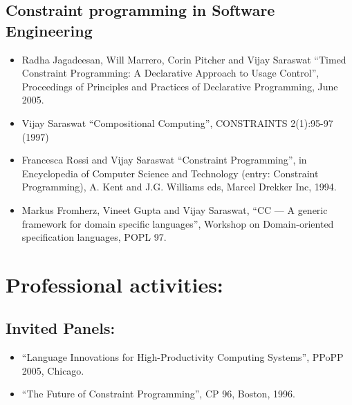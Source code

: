 \documentclass{article}
\begin{document}
\subsection*{Constraint programming in Software Engineering}
\begin{itemize} 

\item Radha Jagadeesan, Will Marrero, Corin Pitcher and Vijay Saraswat
``Timed Constraint Programming: A Declarative Approach to Usage
Control'', Proceedings of Principles and Practices of Declarative
Programming, June 2005.

\item    Vijay Saraswat ``Compositional Computing'', CONSTRAINTS
    2(1):95-97 (1997)


\item Francesca Rossi and Vijay Saraswat ``Constraint Programming'',
in Encyclopedia of Computer Science and Technology (entry: Constraint
Programming), A. Kent and J.G.{} Williams eds, Marcel Drekker Inc,
1994.

\item    Markus Fromherz, Vineet Gupta and Vijay Saraswat, ``CC
     --- A  generic framework for domain specific languages'',
    Workshop  on Domain-oriented specification languages, POPL 97.
\end{itemize} 

\section*{Professional activities:}

\subsection*{Invited Panels:}
\begin{itemize}

\item ``Language Innovations for High-Productivity Computing
Systems'', PPoPP 2005, Chicago.

\item  ``The Future of Constraint Programming'', CP 96, Boston, 1996.
\end{itemize}
\end{document}
